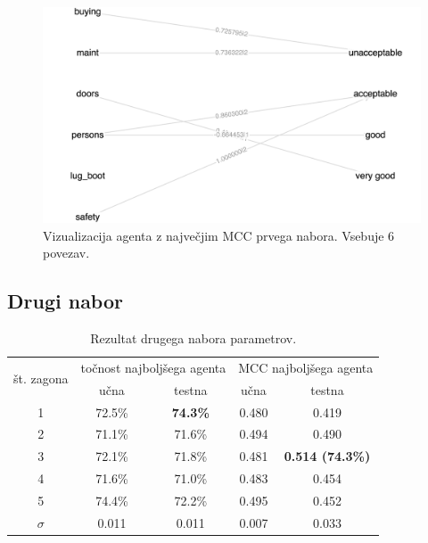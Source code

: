 \begin{figure}[H]
    \begin{center}
        \includegraphics[width=13cm]{car/1/mcc_g}
    \end{center}
    \caption{Vizualizacija agenta z največjim MCC prvega nabora. Vsebuje 6 povezav.}
    \label{fig:car_mcc_1_g}
\end{figure}

\subsection{Drugi nabor}\label{subsec:dodatek-car-drugi-nabor}
\begin{table}[H]
    \begin{center}
        \begin{tabular}{|| c | c c || c c ||}
            \hline
            \multirow{2}{*}{št. zagona} & \multicolumn{2}{c||}{točnost najboljšega agenta} & \multicolumn{2}{c||}{MCC najboljšega agenta} \\ \cline{2-5}
            & učna   & testna          & učna  & testna                  \\
            \hline
            1        & 72.5\% & \textbf{74.3\%} & 0.480 & 0.419                   \\
            \hline
            2        & 71.1\% & 71.6\%          & 0.494 & 0.490                   \\
            \hline
            3        & 72.1\% & 71.8\%          & 0.481 & \textbf{0.514 (74.3\%)} \\
            \hline
            4        & 71.6\% & 71.0\%          & 0.483 & 0.454                   \\
            \hline
            5        & 74.4\% & 72.2\%          & 0.495 & 0.452                   \\
            \hline
            $\sigma$ & 0.011  & 0.011           & 0.007 & 0.033                   \\
            \hline
        \end{tabular}
    \end{center}
    \caption{Rezultat drugega nabora parametrov.}
    \label{tab:car_result_2}
\end{table}


